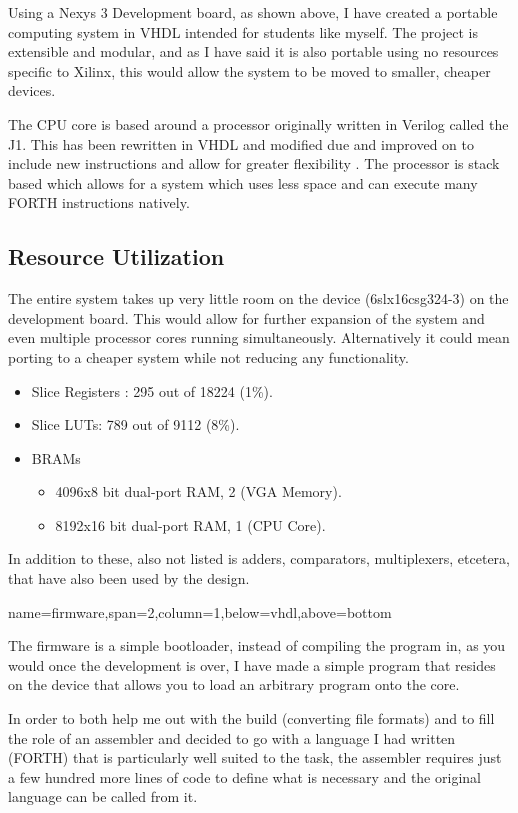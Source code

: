 \documentclass[a1paper,portrait]{baposter}
\begin{document}
\begin{poster}
{Using a Nexys 3 Development board\cite{nexysDigilent}, as shown above,
I have created a portable computing system in VHDL intended for students
like myself. The project is extensible and modular, and as I have said
it is also portable using no resources specific to Xilinx, this would
allow the system to be moved to smaller, cheaper devices.

The CPU core is based around a processor originally written in Verilog
called the J1\cite{j1core}. This has been rewritten in VHDL and modified
due and improved on to include new instructions and allow for greater
flexibility . The processor is stack based which allows for a system which uses
less space and can execute many FORTH instructions natively.

\subsection{Resource Utilization}
The entire system takes up very little room on the device (6slx16csg324-3)
on the development board. This would allow for further expansion of
the system and even multiple processor cores running simultaneously. Alternatively
it could mean porting to a cheaper system while not reducing any functionality.
\begin{center}
    \begin{itemize}
        \item Slice Registers : 295 out of 18224 (1\%).
        \item Slice LUTs: 789 out of 9112 (8\%).
        \item BRAMs 
            \begin{itemize}
                \item 4096x8 bit dual-port RAM, 2 (VGA Memory).
                \item 8192x16 bit dual-port RAM, 1 (CPU Core).
            \end{itemize}
    \end{itemize}
\end{center}

In addition to these, also not listed is adders, comparators, multiplexers, etcetera,
that have also been used by the design.
}

{name=firmware,span=2,column=1,below=vhdl,above=bottom}{
\smaller

The firmware is a simple bootloader, instead of compiling the program in, as you would
once the development is over, I have made a simple program that resides on the device
that allows you to load an arbitrary program onto the core. 

In order to both help me out with the build (converting file formats) and to fill the
role of an assembler and decided to go with a language I had written (FORTH) that is particularly
well suited to the task, the assembler requires just a few hundred more lines of code
to define what is necessary and the original language can be called from it.

}

\end{poster}
\end{document}
